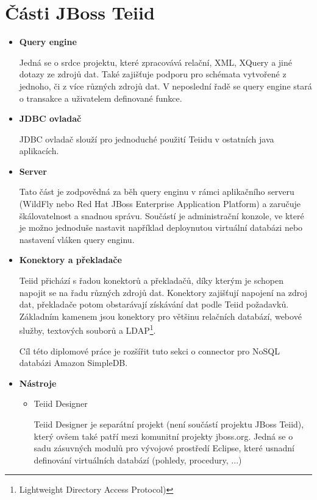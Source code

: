 \documentclass[oneside,11pt]{fithesis2}
\begin{document}
\section{Části JBoss Teiid}
\begin{itemize}
 \item \textbf{Query engine}
 
 Jedná se o srdce projektu, které zpracovává relační, XML, XQuery a jiné dotazy ze zdrojů dat. Také zajišťuje podporu pro schémata vytvořené z jednoho, či z více různých zdrojů dat. V neposlední řadě se query engine stará o transakce a uživatelem definované funkce.
 
 \item \textbf{JDBC ovladač}
 
 JDBC ovladač slouží pro jednoduché použití Teiidu v ostatních java aplikacích.
 
 \item \textbf{Server}
 
 Tato část je zodpovědná za běh query enginu v rámci aplikačního serveru (WildFly nebo Red Hat JBoss Enterprise Application Platform) a zaručuje škálovatelnost a snadnou správu. Součástí je administrační konzole, ve které je možno jednoduše nastavit například deploynutou virtuální databázi nebo nastavení vláken query enginu.
 
 \item \textbf{Konektory a překladače}
 
 Teiid přichází s řadou konektorů a překladačů, díky kterým je schopen napojit se na řadu různých zdrojů dat. Konektory zajišťují napojení na zdroj dat, překladače potom obstarávají získávání dat podle Teiid požadavků. Základním kamenem jsou konektory pro většinu relačních databází, webové služby, textových souborů a LDAP\footnote{Lightweight Directory Access Protocol)}.
 
 Cíl této diplomové práce je rozšířit tuto sekci o connector pro NoSQL databázi Amazon SimpleDB.
 
 \item \textbf{Nástroje}
 
  \begin{itemize}
  \item Teiid Designer
  
  Teiid Designer je separátní projekt (není součástí projektu JBoss Teiid), který ovšem také patří mezi komunitní projekty jboss.org. Jedná se o sadu zásuvných modulů pro vývojové prostředí Eclipse, které usnadní definování virtuálních databází (pohledy, procedury, ...)
  

\end{itemize}
\end{itemize}
\end{document}
